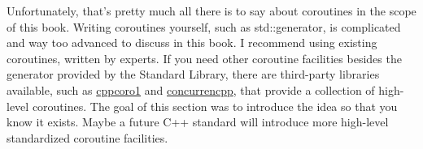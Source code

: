 Unfortunately, that’s pretty much all there is to say about coroutines in the scope of this book. Writing coroutines yourself, such as std::generator, is complicated and way too advanced to discuss in this book. I recommend using existing coroutines, written by experts. If you need other coroutine facilities besides the generator provided by the Standard Library, there are third-party libraries available, such as \href{https://github.com/lewissbaker/cppcoro}{cppcoro1} and \href{https://github.com/David-Haim/concurrencpp}{concurrencpp}, that provide a collection of high-level coroutines. The goal of this section was to introduce the idea so that you know it exists. Maybe a future C++ standard will introduce more high-level standardized coroutine facilities.





